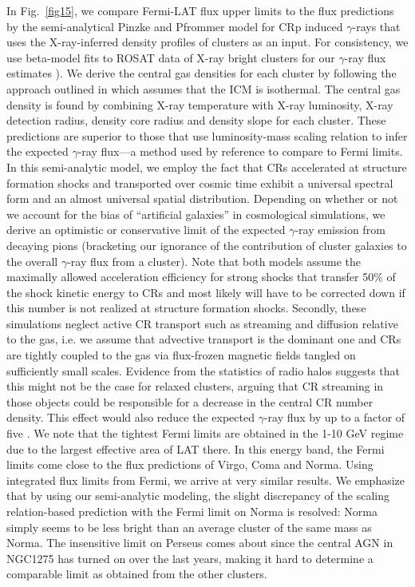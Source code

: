 \documentclass[10pt,aps,pra,reprint,amsmath,amsfonts,amssymb,showpacs,nofootinbib,floatfix]{revtex4-1}
\begin{document}
In Fig.~\ref{fig15}, we compare Fermi-LAT flux upper limits to the
flux predictions by the semi-analytical Pinzke and Pfrommer model
\cite{2010MNRAS.409..449P} for CRp induced $\gamma$-rays that uses the
X-ray-inferred density profiles of clusters as an input. For
consistency, we use beta-model fits to ROSAT data of X-ray bright
clusters for our $\gamma$-ray flux estimates
\cite{2002ApJ...567..716R}). We derive the central gas densities for
each cluster by following the approach outlined in
\cite{1999ApJ...517..627M} which assumes that the ICM is
isothermal. The central gas density is found by combining X-ray
temperature with X-ray luminosity, X-ray detection radius, density
core radius and density slope for each cluster. These predictions are
superior to those that use luminosity-mass scaling relation to infer
the expected $\gamma$-ray flux---a method used by reference
\cite{2010ApJ...717L..71A} to compare to Fermi limits.  In this
semi-analytic model, we employ the fact that CRs accelerated at
structure formation shocks and transported over cosmic time exhibit a
universal spectral form and an almost universal spatial
distribution. Depending on whether or not we account for the bias of
``artificial galaxies'' in cosmological simulations, we derive an
optimistic or conservative limit of the expected $\gamma$-ray emission
from decaying pions (bracketing our ignorance of the contribution of
cluster galaxies to the overall $\gamma$-ray flux from a
cluster). Note that both models assume the maximally allowed
acceleration efficiency for strong shocks that transfer 50\% of the
shock kinetic energy to CRs and most likely will have to be corrected
down if this number is not realized at structure formation
shocks. Secondly, these simulations neglect active CR transport such
as streaming and diffusion relative to the gas, i.e. we assume that
advective transport is the dominant one and CRs are tightly coupled to
the gas via flux-frozen magnetic fields tangled on sufficiently small
scales. Evidence from the statistics of radio halos suggests that this
might not be the case for relaxed clusters, arguing that CR streaming
in those objects could be responsible for a decrease in the central CR
number density. This effect would also reduce the expected
$\gamma$-ray flux by up to a factor of five
\cite{2011A&A...527A..99E}. We note that the tightest Fermi limits are
obtained in the 1-10 GeV regime due to the largest effective area of
LAT there. In this energy band, the Fermi limits come close to the
flux predictions of Virgo, Coma and Norma. Using integrated flux
limits from Fermi, we arrive at very similar results.  We emphasize
that by using our semi-analytic modeling, the slight discrepancy of
the scaling relation-based prediction with the Fermi limit on Norma
\cite{2010ApJ...717L..71A} is resolved: Norma simply seems to be less
bright than an average cluster of the same mass as Norma. The
insensitive limit on Perseus comes about since the central AGN in
NGC1275 has turned on over the last years, making it hard to determine
a comparable limit as obtained from the other clusters.
\end{document}
